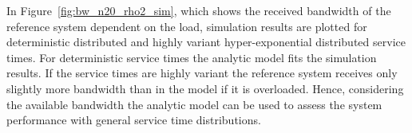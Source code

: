 In Figure~\ref{fig:bw_n20_rho2_sim}, which shows the received bandwidth of the reference system dependent on the load, simulation results are plotted for deterministic distributed and highly variant hyper-exponential distributed service times.
For deterministic service times the analytic model fits the simulation results. If the service times are highly variant the reference system receives only slightly more bandwidth than in the model if it is overloaded. Hence, considering the available bandwidth the analytic model can be used to assess the system performance with general service time distributions.

